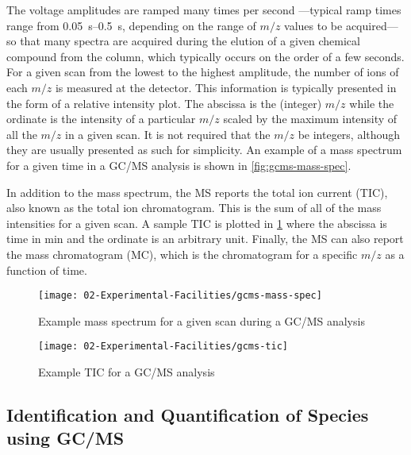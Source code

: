 \documentclass[../main.tex]{subfiles}
\begin{document}
The voltage amplitudes are ramped many times per second%
---typical ramp times range from \SIrange{0.05}{0.5}{\second},
depending on the range of $m/z$ values to be acquired---so that many
spectra are acquired during the elution of a given chemical compound
from the column, which typically occurs on the order of a few seconds.
For a given scan from the lowest to the highest amplitude, the number of ions
of each $m/z$ is measured at the detector. This information is
typically presented in the form of a relative intensity plot. The abscissa
is the (integer) $m/z$ while the ordinate is the intensity of a particular
$m/z$ scaled by the maximum intensity of all the $m/z$ in a given scan. It
is not required that the $m/z$ be integers, although they are usually presented
as such for simplicity. An example of a mass spectrum for a given time in a
GC/MS analysis is shown in \cref{fig:gcms-mass-spec}.

In addition to the mass spectrum, the MS reports the total ion current (TIC),
also known as the total ion chromatogram. This is the sum of all of the mass
intensities for a given scan. A sample TIC is plotted in \cref{fig:gcms-tic}
where the abscissa is time in \si{\minute} and the ordinate is an arbitrary unit.
Finally, the MS can also report the mass chromatogram (MC), which is the
chromatogram for a specific $m/z$ as a function of time.

\begin{figure}
    \begin{floatrow}
        \ffigbox
            {\texttt{[image: 02-Experimental-Facilities/gcms-mass-spec]}}
            {\caption{Example mass spectrum for a given scan during a GC/MS analysis}
            \label{fig:gcms-mass-spec}}
        \ffigbox
            {\texttt{[image: 02-Experimental-Facilities/gcms-tic]}}
            {\caption{Example TIC for a GC/MS analysis}
            \label{fig:gcms-tic}}
    \end{floatrow}
\end{figure}

\subsection{Identification and Quantification of Species using GC/MS}
\end{document}
